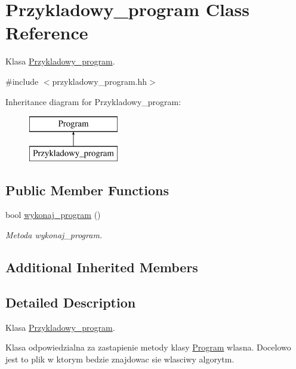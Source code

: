 \hypertarget{class_przykladowy__program}{\section{Przykladowy\-\_\-program Class Reference}
\label{class_przykladowy__program}
}


Klasa \hyperlink{class_przykladowy__program}{Przykladowy\-\_\-program}.  




{\ttfamily \#include $<$przykladowy\-\_\-program.\-hh$>$}

Inheritance diagram for Przykladowy\-\_\-program\-:\begin{figure}[H]
\begin{center}
\leavevmode
\includegraphics[height=2.000000cm]{class_przykladowy__program}
\end{center}
\end{figure}
\subsection*{Public Member Functions}
\begin{DoxyCompactItemize}
\item 
bool \hyperlink{class_przykladowy__program_ab271b3df044dbd4451d0e631b3850406}{wykonaj\-\_\-program} ()
\begin{DoxyCompactList}\small\item\em Metoda wykonaj\-\_\-program. \end{DoxyCompactList}\end{DoxyCompactItemize}
\subsection*{Additional Inherited Members}


\subsection{Detailed Description}
Klasa \hyperlink{class_przykladowy__program}{Przykladowy\-\_\-program}. 

Klasa odpowiedzialna za zastapienie metody klasy \hyperlink{class_program}{Program} wlasna. Docelowo jest to plik w ktorym bedzie znajdowac sie wlasciwy algorytm. 

